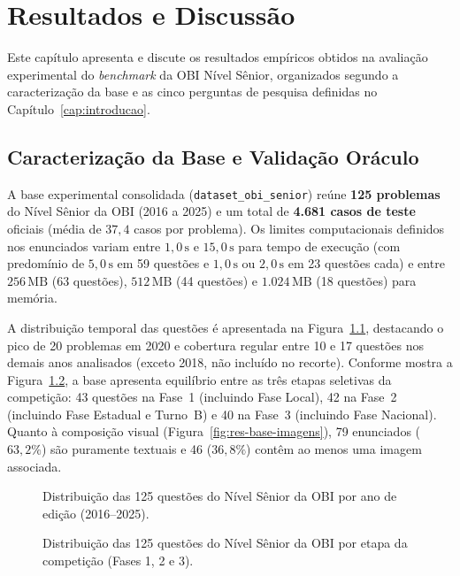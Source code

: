 \chapter{Resultados e Discussão}\label{cap:resultados}

Este capítulo apresenta e discute os resultados empíricos obtidos na avaliação experimental do \textit{benchmark} da OBI Nível Sênior, organizados segundo a caracterização da base e as cinco perguntas de pesquisa definidas no Capítulo~\ref{cap:introducao}.

\section{Caracterização da Base e Validação Oráculo}\label{sec:res-base}

A base experimental consolidada (\texttt{dataset\_obi\_senior}) reúne \textbf{125 problemas} do Nível Sênior da OBI (2016 a 2025) e um total de \textbf{4.681 casos de teste} oficiais (média de $37{,}4$ casos por problema). Os limites computacionais definidos nos enunciados variam entre $1{,}0\,\mathrm{s}$ e $15{,}0\,\mathrm{s}$ para tempo de execução (com predomínio de $5{,}0\,\mathrm{s}$ em 59 questões e $1{,}0\,\mathrm{s}$ ou $2{,}0\,\mathrm{s}$ em 23 questões cada) e entre $256\,\mathrm{MB}$ (63 questões), $512\,\mathrm{MB}$ (44 questões) e $1.024\,\mathrm{MB}$ (18 questões) para memória.

A distribuição temporal das questões é apresentada na Figura~\ref{fig:res-base-ano}, destacando o pico de 20 problemas em 2020 e cobertura regular entre 10 e 17 questões nos demais anos analisados (exceto 2018, não incluído no recorte). Conforme mostra a Figura~\ref{fig:res-base-periodo}, a base apresenta equilíbrio entre as três etapas seletivas da competição: 43 questões na Fase~1 (incluindo Fase Local), 42 na Fase~2 (incluindo Fase Estadual e Turno~B) e 40 na Fase~3 (incluindo Fase Nacional). Quanto à composição visual (Figura~\ref{fig:res-base-imagens}), 79 enunciados ($63{,}2\%$) são puramente textuais e 46 ($36{,}8\%$) contêm ao menos uma imagem associada.

\begin{figure}[!htbp]
\centering

\caption[Distribuição das questões da OBI Sênior por ano]{Distribuição das 125 questões do Nível Sênior da OBI por ano de edição (2016--2025).}
\label{fig:res-base-ano}
\end{figure}

\begin{figure}[!htbp]
\centering

\caption[Distribuição das questões da OBI Sênior por período]{Distribuição das 125 questões do Nível Sênior da OBI por etapa da competição (Fases 1, 2 e 3).}
\label{fig:res-base-periodo}
\end{figure}

